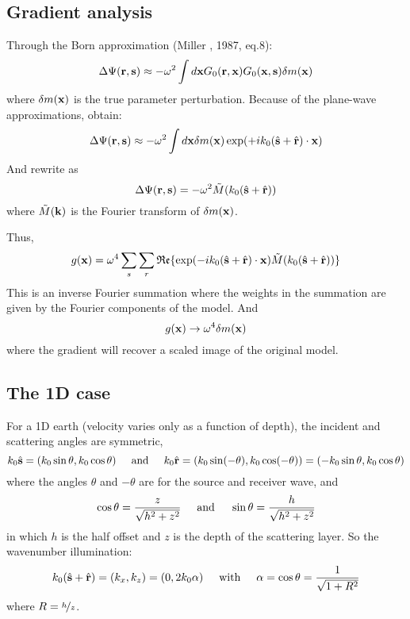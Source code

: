 \subsection{Gradient analysis}
Through the Born approximation (Miller \etal, 1987, eq.8):
\[ \Delta\Psi(\mathbf{r},\mathbf{s})\approx-\omega^2\int d\mathbf{x}G_0(\mathbf{r},\mathbf{x})G_0(\mathbf{x},\mathbf{s})\delta m(\mathbf{x}) \]
where $\delta m(\mathbf{x})$ is the true parameter perturbation.
Because of the plane-wave approximations, obtain:
\[ \Delta\Psi(\mathbf{r},\mathbf{s})\approx-\omega^2\int d\mathbf{x}\delta m(\mathbf{x})\exp(+ik_0(\hat{\mathbf{s}}+\hat{\mathbf{r}})\cdot\mathbf{x}) \]
And rewrite as
\[ \Delta\Psi(\mathbf{r},\mathbf{s})=-\omega^2\tilde{M}(k_0(\hat{\mathbf{s}}+\hat{\mathbf{r}})) \]
where $\tilde{M}(\mathbf{k})$ is the Fourier transform of $\delta m(\mathbf{x})$.

Thus,
\[ g(\mathbf{x})=\omega^4\sum_s\sum_r\mathfrak{Re}\{\exp(-ik_0(\hat{\mathbf{s}}+\hat{\mathbf{r}})\cdot\mathbf{x})\tilde{M}(k_0(\hat{\mathbf{s}}+\hat{\mathbf{r}}))\} \]
This is an inverse Fourier summation
where the weights in the summation are given by the Fourier components of the model.
And
\[ g(\mathbf{x})\rightarrow\omega^4\delta m(\mathbf{x}) \]
where the gradient will recover a scaled image of the original model.

\subsection{The 1D case}
For a 1D earth (velocity varies only as a function of depth),
the incident and scattering angles are symmetric,
\[ k_0\hat{\mathbf{s}}=(k_0\sin\theta,k_0\cos\theta) \text{\hspace{5mm}and\hspace{5mm}} k_0\hat{\mathbf{r}}=(k_0\sin(-\theta),k_0\cos(-\theta))=(-k_0\sin\theta,k_0\cos\theta) \]
where the angles $\theta$ and $-\theta$ are for the source and receiver wave, and
\[ \cos\theta=\frac{z}{\sqrt{h^2+z^2}} \text{\hspace{5mm}and\hspace{5mm}} \sin\theta=\frac{h}{\sqrt{h^2+z^2}} \]
in which $h$ is the half offset and $z$ is the depth of the scattering layer.
So the wavenumber illumination:
\[ k_0(\hat{\mathbf{s}}+\hat{\mathbf{r}})=(k_x,k_z)=(0,2k_0\alpha) \text{\hspace{5mm}with\hspace{5mm}} \alpha=\cos\theta=\frac{1}{\sqrt{1+R^2}} \]
where $R=\nicefrac{h}{z}$.

